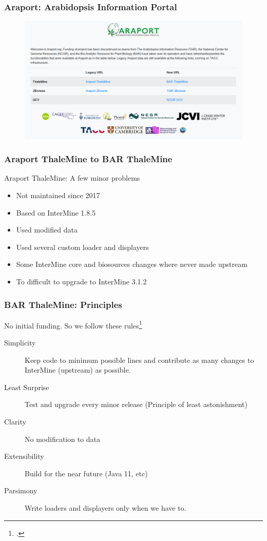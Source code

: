\documentclass{beamer}
\begin{document}
\begin{frame}
    \frametitle{Araport: Arabidopsis Information Portal}
    \begin{figure}[H]
        \centering
        \includegraphics[width=\columnwidth]{img/Araport2020.png}
    \end{figure}
\end{frame}

\begin{frame}
    \frametitle{Araport ThaleMine to BAR ThaleMine}
    Araport ThaleMine: A few minor problems
    \begin{itemize}
        \item Not maintained since 2017
        \item Based on InterMine 1.8.5
        \item Used modified data
        \item Used several custom loader and displayers
        \item Some InterMine core and biosources changes where never made upstream
        \item To difficult to upgrade to InterMine 3.1.2
    \end{itemize}
\end{frame}

\begin{frame}
    \frametitle{BAR ThaleMine: Principles}
    No initial funding. So we follow these rules\footcite{raymond2003}
    \begin{description}
        \item [Simplicity] Keep code to minimum possible lines and contribute as many changes to InterMine (upstream) as possible.
        \item [Least Surprise] Test and upgrade every minor release (Principle of least astonishment)
        \item [Clarity] No modification to data
        \item [Extensibility] Build for the near future (Java 11, etc)
        \item [Parsimony] Write loaders and displayers only when we have to.
    \end{description}
\end{frame}
\end{document}
